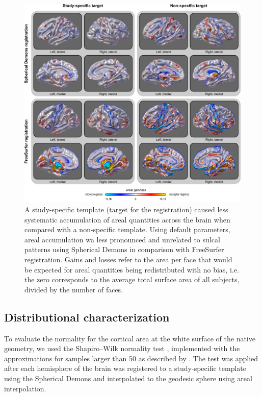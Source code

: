 \begin{figure}[!p]  %
\centering
\includegraphics[width=14cm]{images/registration.png}
\caption[Effect of registration method on areal analyses.]{A study-specific template (target for the registration) caused less systematic accumulation of areal quantities across the brain when compared with a non-specific template. Using default parameters, areal accumulation wa less pronounced and unrelated to sulcal patterns using Spherical Demons in comparison with FreeSurfer registration. Gains and losses refer to the area per face that would be expected for areal quantities being redistributed with no bias, i.e. the zero corresponds to the average total surface area of all subjects, divided by the number of faces.}
\label{fig:areal:registration}
\end{figure}

\subsection{Distributional characterization}

To evaluate the normality for the cortical area at the white surface of the native geometry, we used the Shapiro--Wilk normality test \citep{Shapiro1965}, implemented with the approximations for samples larger than 50 as described by \citet{Royston1993}. The test was applied after each hemisphere of the brain was registered to a study-specific template using the Spherical Demons and interpolated to the geodesic sphere using areal interpolation.

